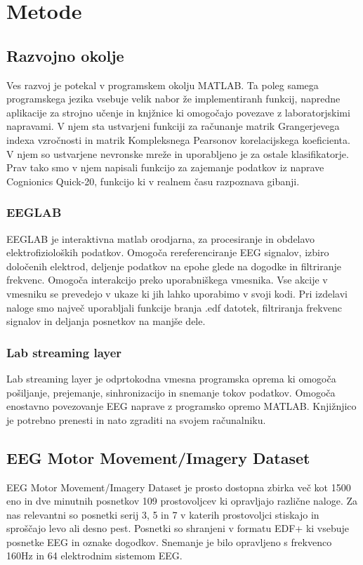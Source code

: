 \chapter{Metode}

\section{Razvojno okolje}
Ves razvoj je potekal v programskem okolju MATLAB. Ta poleg samega programskega jezika vsebuje velik nabor že implementiranh funkcij, napredne aplikacije za strojno učenje in knjžnice ki omogočajo povezave z laboratorjskimi napravami. V njem sta ustvarjeni funkciji za računanje matrik Grangerjevega indexa vzročnosti
in matrik Kompleksnega Pearsonov korelacijskega koeficienta. V njem so ustvarjene nevronske mreže in uporabljeno je za ostale klasifikatorje. Prav tako smo v njem napisali funkcijo za zajemanje podatkov iz naprave Cognionics Quick-20, funkcijo ki v realnem času razpoznava gibanji.
    
\subsection{EEGLAB}
EEGLAB je interaktivna matlab orodjarna, za procesiranje in obdelavo elektrofizioloških podatkov. Omogoča rereferenciranje EEG signalov, izbiro določenih elektrod, deljenje podatkov na epohe glede na dogodke in filtriranje frekvenc. Omogoča interakcijo preko uporabniškega vmesnika. Vse akcije v vmesniku se prevedejo v ukaze ki jih lahko uporabimo v svoji kodi. Pri izdelavi naloge smo največ uporabljali funkcije branja .edf datotek, filtriranja frekvenc signalov in deljanja posnetkov na manjše dele.\cite{noauthor_eeglab_nodate}

\subsection{Lab streaming layer}
Lab streaming layer je odprtokodna vmesna programska oprema ki omogoča pošiljanje, prejemanje, sinhronizacijo in snemanje tokov podatkov. Omogoča enostavno povezovanje EEG naprave z programsko opremo MATLAB. Knjižnjico je potrebno prenesti in nato zgraditi na svojem računalniku.  \cite{noauthor_lsl-website_nodate}

\section{EEG Motor Movement/Imagery Dataset}
EEG Motor Movement/Imagery Dataset je prosto dostopna zbirka več kot 1500 eno in dve minutnih posnetkov 109 prostovoljcev ki opravljajo različne naloge. Za nas relevantni so posnetki serij 3, 5 in 7 v katerih prostovoljci stiskajo in sproščajo levo ali desno pest. Posnetki so shranjeni v formatu EDF+ ki vsebuje posnetke EEG in oznake dogodkov. Snemanje je bilo opravljeno s frekvenco 160Hz in 64 elektrodnim sistemom EEG.\cite{schalk_eeg_2009,schalk_bci2000_2004}

